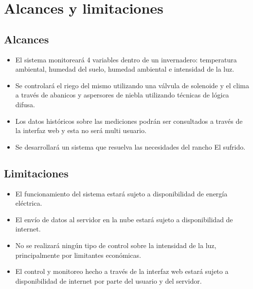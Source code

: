 \section{Alcances y limitaciones}

\subsection*{Alcances}
\begin{itemize}
    \item El sistema monitoreará 4 variables dentro de un invernadero: temperatura ambiental, humedad del suelo, humedad ambiental e intensidad de la luz.
    \item Se controlará el riego del mismo utilizando una válvula de solenoide y el clima a través de abanicos y aspersores de niebla utilizando técnicas de lógica difusa. 
    \item Los datos históricos sobre las mediciones podrán ser consultados a través de la interfaz web y esta no será multi usuario.
    \item Se desarrollará un sistema que resuelva las necesidades del rancho El sufrido.
\end{itemize}

\subsection*{Limitaciones}
\begin{itemize}
    \item El funcionamiento del sistema estará sujeto a disponibilidad de energía eléctrica.
    \item El envío de datos al servidor en la nube estará sujeto a disponibilidad de internet.
    \item No se realizará ningún tipo de control sobre la intensidad de la luz, principalmente por limitantes económicas.
    \item El control y monitoreo hecho a través de la interfaz web estará sujeto a disponibilidad de internet por parte del usuario y del servidor.
\end{itemize}
